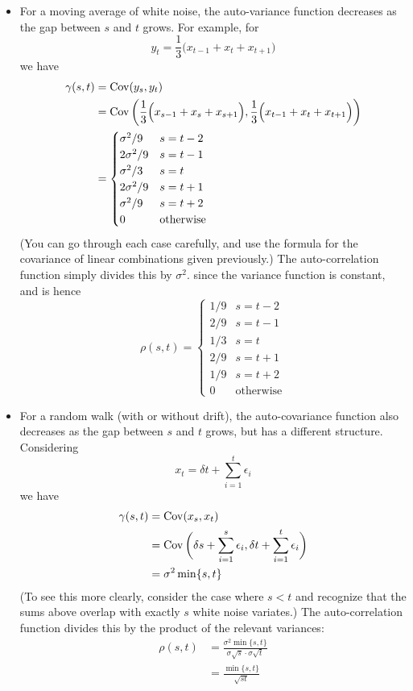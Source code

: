\documentclass{article}
\begin{document}
\begin{itemize}
\item For a moving average of white noise, the auto-variance function decreases
  as the gap between $s$ and $t$ grows. For example, for  
  \[
  y_t = \frac{1}{3} \Big( x_{t-1} + x_t + x_{t+1} \Big)
  \]
  we have
  \begin{align*}
  \gamma(s,t) &= \operatorname{Cov}(y_s, y_t) \\
  &= \operatorname{Cov} \bigg( \frac{1}{3} \Big( x_{s-1} + x_s + x_{s+1} \Big), 
    \frac{1}{3} \Big( x_{t-1} + x_t + x_{t+1} \Big) \bigg) \\
  &= \begin{cases}
  \sigma^2 / 9 & s = t-2 \\
  2\sigma^2 / 9 & s = t-1 \\
  \sigma^2 / 3 & s = t \\
  2\sigma^2 / 9 & s = t+1 \\
  \sigma^2 / 9 & s = t+2 \\
  0 & \text{otherwise}
  \end{cases}
  \end{align*}
  (You can go through each case carefully, and use the formula for the
  covariance of linear combinations given previously.) The auto-correlation
  function simply divides this by $\sigma^2$. since the variance function is 
  constant, and is hence
  \[
  \rho(s,t) = 
  \begin{cases}
  1 / 9 & s = t-2 \\
  2 / 9 & s = t-1 \\
  1 / 3 & s = t \\
  2 / 9 & s = t+1 \\
  1 / 9 & s = t+2 \\
  0 & \text{otherwise}
  \end{cases}
  \]

\item For a random walk (with or without drift), the auto-covariance function
  also decreases as the gap between $s$ and $t$ grows, but has a different 
  structure. Considering 
  \[
  x_t = \delta t + \sum_{i=1}^t \epsilon_i
  \]
  we have
  \begin{align*}
  \gamma(s,t) &= \operatorname{Cov}(x_s, x_t) \\
  &= \operatorname{Cov} \bigg( \delta s + \sum_{i=1}^s \epsilon_i, 
  \delta t + \sum_{i=1}^t \epsilon_i \bigg) \\
  &= \sigma^2 \min\{s, t\}
  \end{align*}
  (To see this more clearly, consider the case where $s<t$ and recognize that 
  the sums above overlap with exactly $s$ white noise variates.) The
  auto-correlation function divides this by the product of the relevant
  variances: 
  \begin{align*}
  \rho(s,t) &= \frac{\sigma^2 \min\{s, t\}}{\sigma \sqrt{s} \cdot \sigma 
              \sqrt{t}} \\  
  &= \frac{\min\{s, t\}}{\sqrt{st}}
  \end{align*}


\end{itemize}
\end{document}
